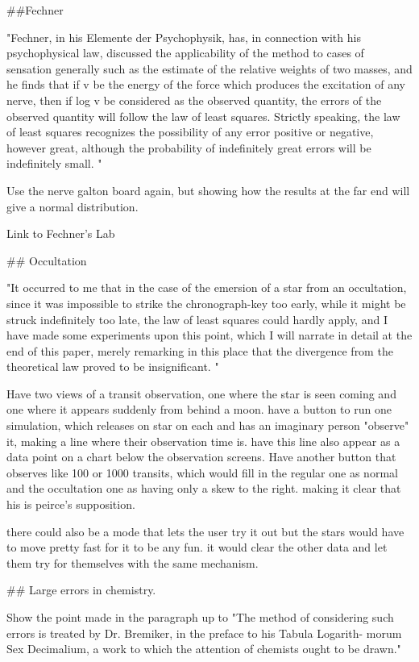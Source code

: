  ##Fechner
 
 "Fechner, in his Elemente der Psychophysik, has, in connection with his psychophysical law, discussed the applicability of the method to cases of sensation generally such as the estimate of the relative weights of two masses, and he finds that if v be the energy of the force which produces the excitation of any nerve, then if log v be considered as the observed quantity, the errors of the observed quantity will follow the law of least squares. Strictly speaking, the law of least squares recognizes the possibility of any error positive or negative, however great, although the probability of indefinitely great errors will be indefinitely small. "
 
 Use the nerve galton board again, but showing how the results at the far end will give a normal distribution. 
 
 Link to Fechner's Lab
 
## Occultation

"It occurred to me that in the case of the emersion of a star from an occultation, since it was impossible to strike the chronograph-key too early, while it might be struck indefinitely too late, the law of least squares could hardly apply, and I have made some experiments upon this point, which I will narrate in detail at the end of this paper, merely remarking in this place that the divergence from the theoretical law proved to be insignificant. "

Have two views of a transit observation, one where the star is seen coming and one where it appears suddenly from behind a moon. have a button to run one simulation, which releases on star on each and has an imaginary person "observe" it, making a line where their observation time is. have this line also appear as a data point on a chart below the observation screens. Have another button that observes like 100 or 1000 transits, which would fill in the regular one as normal and the occultation one as having only a skew to the right. making it clear that his is peirce's supposition. 

there could also be a mode that lets the user try it out but the stars would have to move pretty fast for it to be any fun. it would clear the other data and let them try for themselves with the same mechanism. 


## Large errors in chemistry. 

Show the point made in the paragraph up to "The method of considering such errors is treated by Dr. Bremiker, in the preface to his Tabula Logarith- morum Sex Decimalium, a work to which the attention of chemists ought to be drawn."

